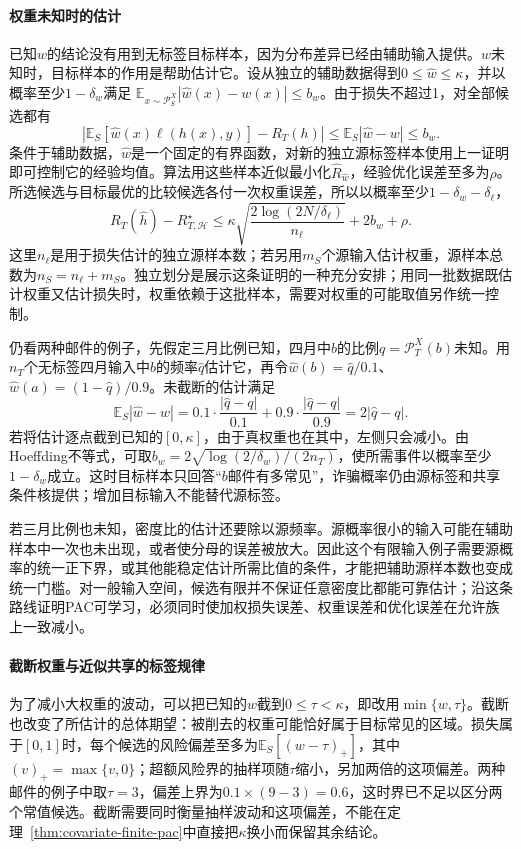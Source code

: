 \paragraph{权重未知时的估计}
已知$w$的结论没有用到无标签目标样本，因为分布差异已经由辅助输入提供。$w$未知时，目标样本的作用是帮助估计它。设从独立的辅助数据得到$0\leq\widehat w\leq\kappa$，并以概率至少$1-\delta_w$满足
$\mathbb E_{x\sim\mathcal P_S^X}|\widehat w(x)-w(x)|\leq b_w$。由于损失不超过1，对全部候选都有
\[
 \left|\mathbb E_S[\widehat w(x)\ell(h(x),y)]-R_T(h)\right|
 \leq\mathbb E_S|\widehat w-w|\leq b_w .
\]
条件于辅助数据，$\widehat w$是一个固定的有界函数，对新的独立源标签样本使用上一证明即可控制它的经验均值。算法用这些样本近似最小化$\widehat R_{\widehat w}$，经验优化误差至多为$\rho$。所选候选与目标最优的比较候选各付一次权重误差，所以以概率至少$1-\delta_w-\delta_\ell$，
\[
 R_T(\widehat h)-R_{T,\mathcal H}^{\star}
 \leq\kappa\sqrt{\frac{2\log(2N/\delta_\ell)}{n_\ell}}+2b_w+\rho .
\]
这里$n_\ell$是用于损失估计的独立源样本数；若另用$m_S$个源输入估计权重，源样本总数为$n_S=n_\ell+m_S$。独立划分是展示这条证明的一种充分安排；用同一批数据既估计权重又估计损失时，权重依赖于这批样本，需要对权重的可能取值另作统一控制。

仍看两种邮件的例子，先假定三月比例已知，四月中$b$的比例$q=\mathcal P_T^X(b)$未知。用$n_T$个无标签四月输入中$b$的频率$\widehat q$估计它，再令$\widehat w(b)=\widehat q/0.1$、$\widehat w(a)=(1-\widehat q)/0.9$。未截断的估计满足
\[
 \mathbb E_S|\widehat w-w|
 =0.1\cdot\frac{|\widehat q-q|}{0.1}+0.9\cdot\frac{|\widehat q-q|}{0.9}
 =2|\widehat q-q| .
\]
若将估计逐点截到已知的$[0,\kappa]$，由于真权重也在其中，左侧只会减小。由Hoeffding不等式，可取$b_w=2\sqrt{\log(2/\delta_w)/(2n_T)}$，使所需事件以概率至少$1-\delta_w$成立。这时目标样本只回答“$b$邮件有多常见”，诈骗概率仍由源标签和共享条件核提供；增加目标输入不能替代源标签。

若三月比例也未知，密度比的估计还要除以源频率。源概率很小的输入可能在辅助样本中一次也未出现，或者使分母的误差被放大。因此这个有限输入例子需要源概率的统一正下界，或其他能稳定估计所需比值的条件，才能把辅助源样本数也变成统一门槛。对一般输入空间，候选有限并不保证任意密度比都能可靠估计；沿这条路线证明PAC可学习，必须同时使加权损失误差、权重误差和优化误差在允许族上一致减小。

\paragraph{截断权重与近似共享的标签规律}
为了减小大权重的波动，可以把已知的$w$截到$0\leq\tau<\kappa$，即改用$\min\{w,\tau\}$。截断也改变了所估计的总体期望：被削去的权重可能恰好属于目标常见的区域。损失属于$[0,1]$时，每个候选的风险偏差至多为$\mathbb E_S[(w-\tau)_+]$，其中$(v)_+=\max\{v,0\}$；超额风险界的抽样项随$\tau$缩小，另加两倍的这项偏差。两种邮件的例子中取$\tau=3$，偏差上界为$0.1\times(9-3)=0.6$，这时界已不足以区分两个常值候选。截断需要同时衡量抽样波动和这项偏差，不能在定理~\ref{thm:covariate-finite-pac}中直接把$\kappa$换小而保留其余结论。

